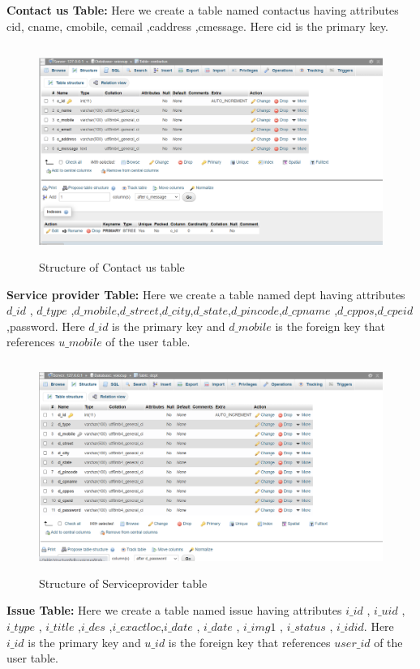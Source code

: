 \documentclass[12pt,a4paper]{report}
\begin{document}
\noindent\textbf{Contact us Table:}
Here we create a table named contactus having attributes cid, cname, cmobile, cemail ,caddress ,cmessage. Here cid is the primary key.\\
\begin{figure}[hbtp]
\centering
\includegraphics[width=6.4in,height=2.7in]{fc.png}
\caption{Structure of  Contact us table}
\end{figure}
\vspace{2.5in}

\noindent\textbf{Service provider Table:}
Here we create a table named dept having attributes $d\_id$ , $d\_type$ ,$d\_mobile$,$d\_street$,$d\_city$,$d\_state$,$d\_pincode$,$d\_cpname$ ,$d\_cppos$,$d\_cpeid$,password. Here $d\_id$  is the primary key and  $d\_mobile$ is the foreign key that references $u\_mobile$ of the user table.\\

\begin{figure}[hbtp]
\centering
\includegraphics[width=6.4in,height=2.7in]{fd.png}
\caption{Structure of Serviceprovider table}
\end{figure}
\noindent \textbf{Issue Table:}
Here we create a table named issue having attributes $i\_id$ , $i\_uid$ ,$i\_type$ , $i\_title$ ,$i\_des$ ,$i\_exactloc$,$i\_date$ , $i\_date$ , $i\_img1$ , $i\_status$ , $i\_idid$. Here $i\_id$ is the primary key and $u\_id$ is the foreign key that references $user\_id$ of the user table.\\
\end{document}
